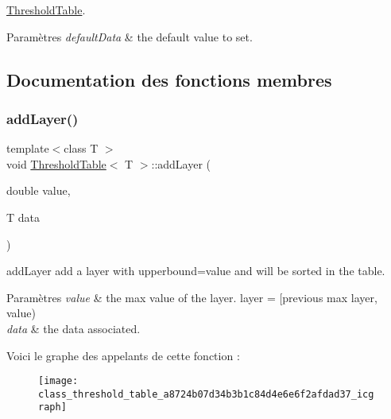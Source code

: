 \hyperlink{class_threshold_table}{Threshold\+Table}. 


\begin{DoxyParams}{Paramètres}
{\em default\+Data} & the default value to set. \\
\hline
\end{DoxyParams}


\subsection{Documentation des fonctions membres}
\mbox{\label{class_threshold_table_a8724b07d34b3b1c84d4e6e6f2afdad37}} 
\subsubsection{\texorpdfstring{add\+Layer()}{addLayer()}\hspace{0.1cm}{\footnotesize\ttfamily [1/2]}}
{\footnotesize\ttfamily template$<$class T $>$ \\
void \hyperlink{class_threshold_table}{Threshold\+Table}$<$ T $>$\+::add\+Layer (\begin{DoxyParamCaption}\item[{double}]{value,  }\item[{T}]{data }\end{DoxyParamCaption})\hspace{0.3cm}{\ttfamily [inline]}}



add\+Layer add a layer with upperbound=value and will be sorted in the table. 


\begin{DoxyParams}{Paramètres}
{\em value} & the max value of the layer. layer = \mbox{[}previous max layer, value) \\
\hline
{\em data} & the data associated. \\
\hline
\end{DoxyParams}
Voici le graphe des appelants de cette fonction \+:\nopagebreak
\begin{figure}[H]
\begin{center}
\leavevmode
\texttt{[image: class\_threshold\_table\_a8724b07d34b3b1c84d4e6e6f2afdad37\_icgraph]}
\end{center}
\end{figure}
\mbox{\label{class_threshold_table_a0323e0da4f0a97b1b3f84c1d2ae7a5b2}} 
